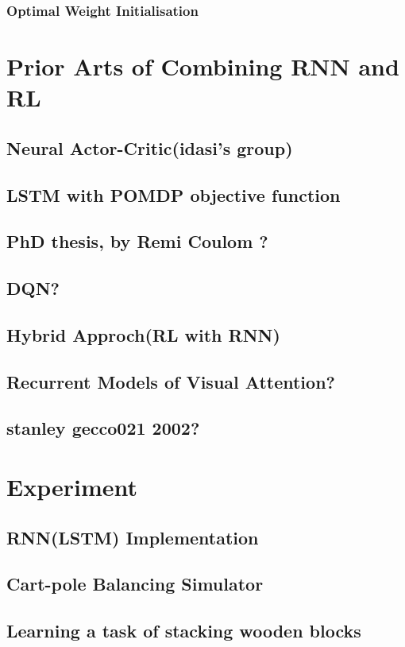 \documentclass[officiallayout]{tktla}
\begin{document}
\subsection{Optimal Weight Initialisation}

\chapter{Prior Arts of Combining RNN and RL}
\section{Neural Actor-Critic(idasi's group)}
\section{LSTM with POMDP objective function}
\section{PhD thesis, by Remi Coulom ?}

\section{DQN?}
\section{Hybrid Approch(RL with RNN)}
\section{Recurrent Models of Visual Attention?}       
\section{stanley gecco021 2002?}
\chapter{Experiment}
\section{RNN(LSTM) Implementation}
\section{Cart-pole Balancing Simulator}
\section{Learning a task of stacking wooden blocks}
\end{document}

